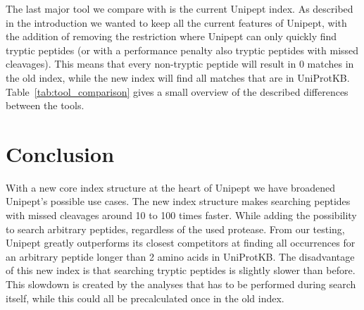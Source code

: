 \documentclass[11pt]{article}
\newenvironment{Table}
{\par\medskip\noindent\minipage{\linewidth}}
{\endminipage\par\medskip}
\begin{document}
\begin{multicols}{2}
        The last major tool we compare with is the current Unipept index.
        As described in the introduction we wanted to keep all the current features of Unipept, with the addition of removing the restriction where Unipept can only quickly find tryptic peptides (or with a performance penalty also tryptic peptides with missed cleavages).
        This means that every non-tryptic peptide will result in 0 matches in the old index, while the new index will find all matches that are in UniProtKB\@.
        Table~\ref{tab:tool_comparison} gives a small overview of the described differences between the tools.

        \begin{Table}
            \centering
            \label{tab:tool_comparison}
        \end{Table}

        \section{Conclusion}\label{sec:discussion}
        With a new core index structure at the heart of Unipept we have broadened Unipept's possible use cases.
        The new index structure makes searching peptides with missed cleavages around 10 to 100 times faster.
        While adding the possibility to search arbitrary peptides, regardless of the used protease.
        From our testing, Unipept greatly outperforms its closest competitors at finding all occurrences for an arbitrary peptide longer than 2 amino acids in UniProtKB\@.
        The disadvantage of this new index is that searching tryptic peptides is slightly slower than before.
        This slowdown is created by the analyses that has to be performed during search itself, while this could all be precalculated once in the old index.


\end{multicols}
\end{document}
